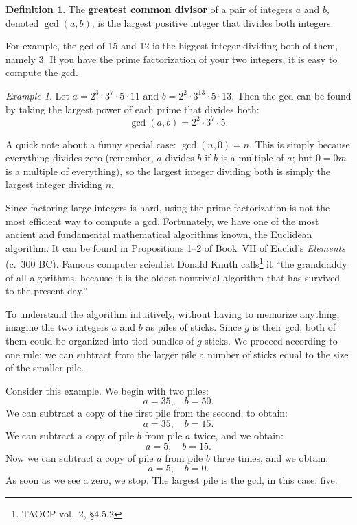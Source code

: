 \documentclass{article}
\theoremstyle{plain}
\theoremstyle{definition}
\newtheorem{definition}[theorem]{Definition}
\theoremstyle{remark}
\newtheorem{example}[theorem]{Example}
\numberwithin{theorem}{section}
\begin{document}
\begin{definition}
	The \textbf{greatest common divisor} of a pair of integers $a$ and $b$, denoted $\gcd(a,b)$, is the largest positive integer that divides both integers.
\end{definition}

For example, the gcd of 15 and 12 is the biggest integer dividing both of them, namely 3. 
If you have the prime factorization of your two integers, it is easy to compute the gcd.

\begin{example}
	Let $a = 2^3 \cdot 3^7 \cdot 5 \cdot 11$ and $b = 2^2 \cdot 3^{13} \cdot 5 \cdot 13$.  Then the gcd can be found by taking the largest power of each prime that divides both:
	\[
		\gcd(a,b) = 2^2 \cdot 3^7 \cdot 5.
	\]
\end{example}

A quick note about a funny special case: $\gcd(n,0) = n$.  This is simply because everything divides zero (remember, $a$ divides $b$ if $b$ is a multiple of $a$; but $0 = 0m$ is a multiple of everything), so the largest integer dividing both is simply the largest integer dividing $n$.

Since factoring large integers is hard, using the prime factorization is not the most efficient way to compute a gcd.  Fortunately, we have one of the most ancient and fundamental mathematical algorithms known, the Euclidean algorithm.  It can be found in Propositions 1--2 of Book~VII of Euclid's \emph{Elements} (c.~300 BC).  Famous computer scientist Donald Knuth calls\footnote{TAOCP vol.~2, \S4.5.2} it ``the granddaddy of all algorithms, because it is the oldest nontrivial algorithm that has survived to the present day.''

To understand the algorithm intuitively, without having to memorize anything, imagine the two integers $a$ and $b$ as piles of sticks.  Since $g$ is their gcd, both of them could be organized into tied bundles of $g$ sticks.  We proceed according to one rule:  we can subtract from the larger pile a number of sticks equal to the size of the smaller pile.

Consider this example.  We begin with two piles:
\[
	a = 35, \quad b = 50.
\]
We can subtract a copy of the first pile from the second, to obtain:
\[
	a = 35, \quad b = 15.
\]
We can subtract a copy of pile $b$ from pile $a$ twice, and we obtain:
\[
	a = 5, \quad b = 15.
\]
Now we can subtract a copy of pile $a$ from pile $b$ three times, and we obtain:
\[
	a = 5, \quad b = 0.
\]
As soon as we see a zero, we stop.  The largest pile is the gcd, in this case, five.
\end{document}
